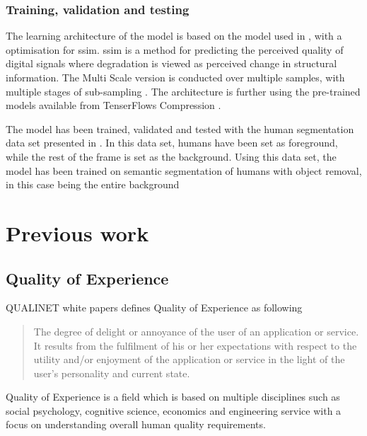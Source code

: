 \subsubsection{Training, validation and testing}
The learning architecture of the model is based on the model used in \cite{bmshj2018}, with a optimisation for \acrfull{ssim}. \acrshort{ssim} is a method for predicting the perceived quality of digital signals where degradation is viewed as perceived change in structural information. The Multi Scale version is conducted over multiple samples, with multiple stages of sub-sampling \cite{mssssim}. The architecture is further using the pre-trained models available from TenserFlows Compression \cite{tensorflow_compression}.

The model has been trained, validated and tested with the human segmentation data set presented in \cite{gmnu21}. In this data set, humans have been set as foreground, while the rest of the frame is set as the background. Using this data set, the model has been trained on semantic segmentation of humans with object removal, in this case being the entire background


\section{Previous work}

\subsection{Quality of Experience}
\label{sec:qoe}
QUALINET white papers defines Quality of Experience as following \cite{book_QoE}

\begin{quote}
The degree of delight or annoyance of the user of an application or service. It results from the fulfilment of his or her expectations with respect to the utility and/or enjoyment of the application or service in the light of the user’s personality and current state.
\end{quote}

Quality of Experience is a field which is based on multiple disciplines such as social psychology, cognitive science, economics and engineering service with a focus on understanding overall human quality requirements.

